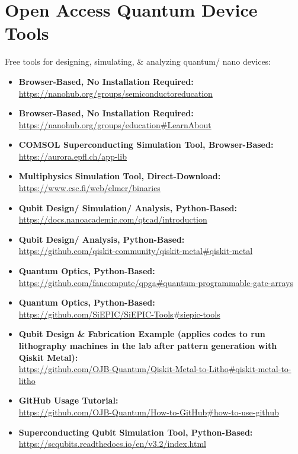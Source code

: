 \chapter{\LARGE Open Access Quantum Device Tools}

\begin{flushleft}
\large Free tools for designing, simulating, \& analyzing quantum/ nano devices:
\end{flushleft}

\normalsize\begin{itemize}

  \item\textbf{Browser-Based, No Installation Required:}\\
\url{https://nanohub.org/groups/semiconductoreducation}
  \item\textbf{Browser-Based, No Installation Required:}\\
\url{https://nanohub.org/groups/education#LearnAbout}
  \item\textbf{COMSOL Superconducting Simulation Tool, Browser-Based:}\\
\url{https://aurora.epfl.ch/app-lib}
  \item\textbf{Multiphysics Simulation Tool, Direct-Download:}\\
\url{https://www.csc.fi/web/elmer/binaries}
  \item\textbf{Qubit Design/ Simulation/ Analysis, Python-Based:}\\
\url{https://docs.nanoacademic.com/qtcad/introduction}
  \item\textbf{Qubit Design/ Analysis, Python-Based:}\\
\url{https://github.com/qiskit-community/qiskit-metal#qiskit-metal}
  \item\textbf{Quantum Optics, Python-Based:}\\
\url{https://github.com/fancompute/qpga#quantum-programmable-gate-arrays}
  \item\textbf{Quantum Optics, Python-Based:}\\
\url{https://github.com/SiEPIC/SiEPIC-Tools#siepic-tools}
  \item\textbf{Qubit Design \& Fabrication Example (applies codes to run lithography machines in the lab after pattern generation with Qiskit Metal):}\\
\url{https://github.com/OJB-Quantum/Qiskit-Metal-to-Litho#qiskit-metal-to-litho}
  \item\textbf{GitHub Usage Tutorial:}\\
\url{https://github.com/OJB-Quantum/How-to-GitHub#how-to-use-github}
  \item\textbf{Superconducting Qubit Simulation Tool, Python-Based:}\\
\url{https://scqubits.readthedocs.io/en/v3.2/index.html}\\

\end{itemize}

